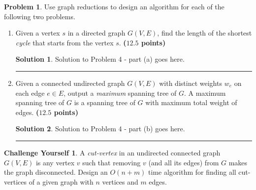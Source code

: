 \documentclass{article}
\theoremstyle{definition}
\newtheorem{problem}{Problem}
\newtheorem*{challenge}{Challenge Yourself}
\def\fline{\rule{0.75\linewidth}{0.5pt}}
\newcommand{\finishline}{\vspace{-15pt}\begin{center}\fline\end{center}}
\newtheorem*{solution*}{Solution}
\newenvironment{solution}{\begin{solution*}}{{\finishline} \end{solution*}}
\newcommand{\grade}[1]{\hfill{\textbf{($\mathbf{#1}$ points)}}}
\begin{document}
\smallskip



\begin{problem}
	Use graph reductions to design an algorithm for each of the following two problems. 
	\begin{enumerate}[label=(\alph*)]
		\item Given a vertex $s$ in a directed graph $G(V,E)$, find the length of the shortest \emph{cycle} that starts from the vertex $s$. \grade{12.5} 
		
		\smallskip
		
			\begin{solution}
	Solution to Problem 4 - part (a) goes here.
\end{solution}

		\item Given a connected undirected graph $G(V,E)$ with distinct weights $w_e$ on each edge $e \in E$, output a \emph{maximum} spanning tree of $G$. A maximum spanning tree of $G$ is a spanning tree of $G$ with maximum total weight of edges. 
		\grade{12.5}
		
				\smallskip
		
			\begin{solution}
	Solution to Problem 4 - part (b) goes here.
\end{solution}

	\end{enumerate}
	
\end{problem}



\begin{challenge}
	A \emph{cut-vertex} in an undirected connected graph $G(V,E)$ is any vertex $v$ such that removing $v$ (and all its edges) from $G$ makes the graph disconnected. Design an $O(n+m)$ time algorithm
	 for finding all cut-vertices of a given graph with $n$ vertices and $m$ edges. 
\end{challenge}
\end{document}
